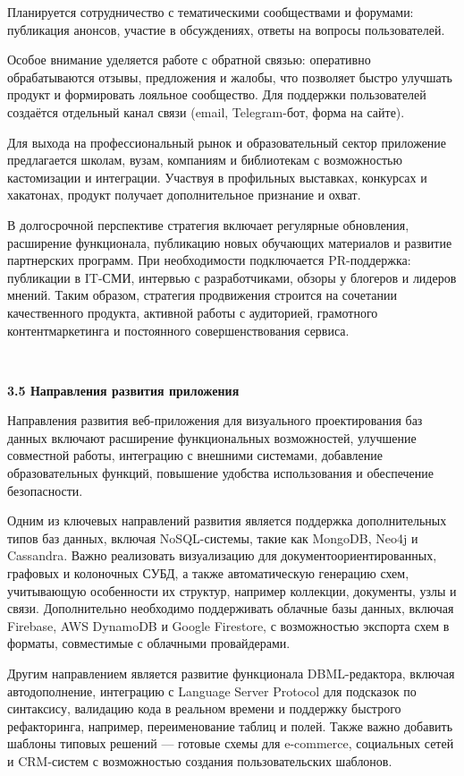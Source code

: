 Планируется сотрудничество с тематическими сообществами и
форумами: публикация анонсов, участие в обсуждениях, ответы на вопросы
пользователей.

Особое внимание уделяется работе с обратной связью: оперативно
обрабатываются отзывы, предложения и жалобы, что позволяет быстро
улучшать продукт и формировать лояльное сообщество. Для поддержки
пользователей создаётся отдельный канал связи (email, Telegram-бот, форма
на сайте).

Для выхода на профессиональный рынок и образовательный сектор
приложение предлагается школам, вузам, компаниям и библиотекам с
возможностью кастомизации и интеграции. Участвуя в профильных
выставках, конкурсах и хакатонах, продукт получает дополнительное
признание и охват.

В долгосрочной перспективе стратегия включает регулярные
обновления, расширение функционала, публикацию новых обучающих
материалов и развитие партнерских программ. При необходимости
подключается PR-поддержка: публикации в IT-СМИ, интервью с
разработчиками, обзоры у блогеров и лидеров мнений.
Таким образом, стратегия продвижения строится на сочетании
качественного продукта, активной работы с аудиторией, грамотного контентмаркетинга и постоянного совершенствования сервиса.

\

\textbf{3.5 Направления развития приложения}

Направления развития веб-приложения для визуального проектирования баз данных включают расширение функциональных возможностей, улучшение совместной работы, интеграцию с внешними системами, добавление образовательных функций, повышение удобства использования и обеспечение безопасности.

Одним из ключевых направлений развития является поддержка дополнительных типов баз данных, включая NoSQL-системы, такие как MongoDB, Neo4j и Cassandra. Важно реализовать визуализацию для документоориентированных, графовых и колоночных СУБД, а также автоматическую генерацию схем, учитывающую особенности их структур, например коллекции, документы, узлы и связи. Дополнительно необходимо поддерживать облачные базы данных, включая Firebase, AWS DynamoDB и Google Firestore, с возможностью экспорта схем в форматы, совместимые с облачными провайдерами.

Другим направлением является развитие функционала DBML-редактора, включая автодополнение, интеграцию с Language Server Protocol для подсказок по синтаксису, валидацию кода в реальном времени и поддержку быстрого рефакторинга, например, переименование таблиц и полей. Также важно добавить шаблоны типовых решений — готовые схемы для e-commerce, социальных сетей и CRM-систем с возможностью создания пользовательских шаблонов.

